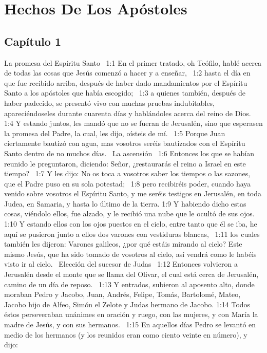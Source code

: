 \chapter{Hechos De Los Apóstoles}


\section*{Capítulo 1}
La promesa del Espíritu Santo  
1:1 En el primer tratado, oh Teófilo, hablé acerca de todas las cosas que Jesús comenzó a hacer y a enseñar,  
1:2 hasta el día en que fue recibido arriba, después de haber dado mandamientos por el Espíritu Santo a los apóstoles que había escogido;  
1:3 a quienes también, después de haber padecido, se presentó vivo con muchas pruebas indubitables, apareciéndoseles durante cuarenta días y hablándoles acerca del reino de Dios.  
1:4 Y estando juntos, les mandó que no se fueran de Jerusalén, sino que esperasen la promesa del Padre, la cual, les dijo, oísteis de mí.  
1:5 Porque Juan ciertamente bautizó con agua, mas vosotros seréis bautizados con el Espíritu Santo dentro de no muchos días.  
La ascensión  
1:6 Entonces los que se habían reunido le preguntaron, diciendo: Señor, ¿restaurarás el reino a Israel en este tiempo?  
1:7 Y les dijo: No os toca a vosotros saber los tiempos o las sazones, que el Padre puso en su sola potestad;  
1:8 pero recibiréis poder, cuando haya venido sobre vosotros el Espíritu Santo, y me seréis testigos en Jerusalén, en toda Judea, en Samaria, y hasta lo último de la tierra. 
1:9 Y habiendo dicho estas cosas, viéndolo ellos, fue alzado, y le recibió una nube que le ocultó de sus ojos. 
1:10 Y estando ellos con los ojos puestos en el cielo, entre tanto que él se iba, he aquí se pusieron junto a ellos dos varones con vestiduras blancas,  
1:11 los cuales también les dijeron: Varones galileos, ¿por qué estáis mirando al cielo? Este mismo Jesús, que ha sido tomado de vosotros al cielo, así vendrá como le habéis visto ir al cielo.  
Elección del sucesor de Judas  
1:12 Entonces volvieron a Jerusalén desde el monte que se llama del Olivar, el cual está cerca de Jerusalén, camino de un día de reposo.  
1:13 Y entrados, subieron al aposento alto, donde moraban Pedro y Jacobo, Juan, Andrés, Felipe, Tomás, Bartolomé, Mateo, Jacobo hijo de Alfeo, Simón el Zelote y Judas hermano de Jacobo. 
1:14 Todos éstos perseveraban unánimes en oración y ruego, con las mujeres, y con María la madre de Jesús, y con sus hermanos.  
1:15 En aquellos días Pedro se levantó en medio de los hermanos (y los reunidos eran como ciento veinte en número), y dijo:  
